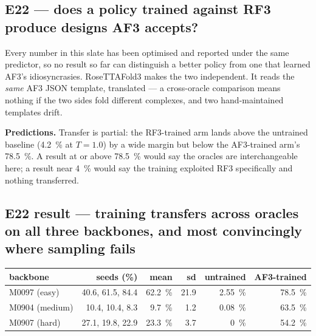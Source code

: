 \subsection*{E22 --- does a policy trained against RF3 produce designs AF3
accepts?}


Every number in this slate has been optimised and reported under the same
predictor, so no result so far can distinguish a better policy from one that
learned AF3's idiosyncrasies. RoseTTAFold3 makes the two independent. It reads
the \emph{same} AF3 JSON template, translated --- a cross-oracle comparison
means nothing if the two sides fold different complexes, and two
hand-maintained templates drift.

\textbf{Predictions.} Transfer is partial: the RF3-trained arm lands above the
untrained baseline (\SI{4.2}{\percent} at \(T=1.0\)) by a wide margin but below
the AF3-trained arm's \SI{78.5}{\percent}. A result at or above
\SI{78.5}{\percent} would say the oracles are interchangeable here; a result
near \SI{4}{\percent} would say the training exploited RF3 specifically and
nothing transferred.

\subsection*{E22 result --- training transfers across oracles on all three
backbones, and most convincingly where sampling fails}


\begin{center}
\begin{tabular}{lrrrrr}
\toprule
backbone & seeds (\%) & mean & sd & untrained & AF3-trained \\
\midrule
M0097 (easy)   & 40.6, 61.5, 84.4 & \SI{62.2}{\percent} & 21.9 & \SI{2.55}{\percent} & \SI{78.5}{\percent} \\
M0904 (medium) & 10.4, 10.4, 8.3  & \SI{9.7}{\percent}  & 1.2  & \SI{0.08}{\percent} & \SI{63.5}{\percent} \\
M0907 (hard)   & 27.1, 19.8, 22.9 & \SI{23.3}{\percent} & 3.7  & \SI{0}{\percent}    & \SI{54.2}{\percent} \\
\bottomrule
\end{tabular}
\end{center}

